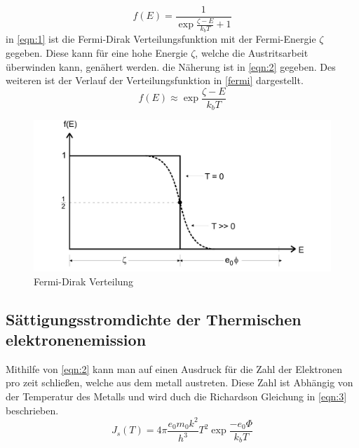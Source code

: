 \begin{equation}
    \label{eqn:1}
    f\left(E\right) = \frac{1}{\exp{\frac{\zeta-E}{k_b T} + 1}}
\end{equation}
\noindent in \autoref{eqn:1} ist die Fermi-Dirak Verteilungsfunktion mit der Fermi-Energie $\zeta$ gegeben. Diese kann 
für eine hohe Energie $\zeta$, welche die Austritsarbeit überwinden kann, genähert werden. die Näherung ist in \autoref{eqn:2} 
gegeben. Des weiteren ist der Verlauf der Verteilungsfunktion in \autoref{fermi} dargestellt.
\begin{equation}
    \label{eqn:2}
    f\left(E\right) \approx \exp{\frac{\zeta-E}{k_b T}}
\end{equation}
\begin{figure}[H]
    \centering
        \centering
        \includegraphics[width=\textwidth]{Bilder/Fermi-Dirac.jpg}
        \caption{Fermi-Dirak Verteilung}
    \hfill
    \label{fig:fermi}
\end{figure}

\subsection{Sättigungsstromdichte der Thermischen elektronenemission}
Mithilfe von \autoref{eqn:2} kann man auf einen Ausdruck für die Zahl der Elektronen pro zeit schließen, welche 
aus dem metall austreten. Diese Zahl ist Abhängig von der Temperatur des Metalls und wird duch die Richardson Gleichung 
in \autoref{eqn:3} beschrieben.
\begin{equation}
    \label{eqn:2}
    J_s \left(T\right) = 4\pi \frac{e_0m_0k^2}{h^3}T^2\exp{\frac{-e_0\Phi}{k_b T}}
\end{equation}


